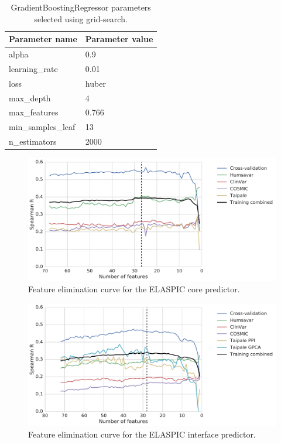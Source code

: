 \begin{table}[tb]
	\centering
	\caption[Interface predictor hyperparameters.]{GradientBoostingRegressor parameters selected using grid-search.}
	\label{tab:interface_hyperparameters}
	\begin{tabular}{ l | l }
		\toprule
		Parameter name     & Parameter value \\
		\midrule
		alpha              & 0.9             \\
		learning\_rate     & 0.01            \\
		loss               & huber           \\
		max\_depth         & 4               \\
		max\_features      & 0.766           \\
		min\_samples\_leaf & 13              \\
		n\_estimators      & 2000            \\
		\bottomrule
	\end{tabular}
\end{table}



\clearpage

\begin{figure}[tb]
	\includegraphics[width=0.9\linewidth]{static/elaspic_training_set/machine_learning/feature_elimination_core.pdf}
	\caption[Core predictor feature elimination.]{Feature elimination curve for the ELASPIC core predictor.}
	\label{fig:feature_elimination_core}
\end{figure}

\begin{figure}[tb]
	\includegraphics[width=0.9\linewidth]{static/elaspic_training_set/machine_learning/feature_elimination_interface.pdf}
	\caption[Interface predictor feature elimination.]{Feature elimination curve for the ELASPIC interface predictor.}
	\label{fig:feature_elimination_interface}
\end{figure}



